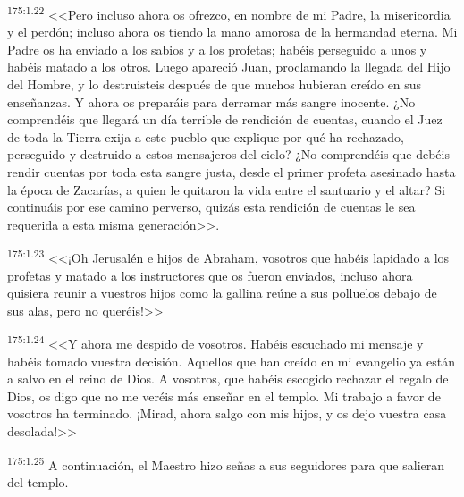 \par 
\textsuperscript{175:1.22} <<Pero incluso ahora os ofrezco, en nombre de mi Padre, la misericordia y el perdón; incluso ahora os tiendo la mano amorosa de la hermandad eterna. Mi Padre os ha enviado a los sabios y a los profetas; habéis perseguido a unos y habéis matado a los otros. Luego apareció Juan, proclamando la llegada del Hijo del Hombre, y lo destruisteis después de que muchos hubieran creído en sus enseñanzas. Y ahora os preparáis para derramar más sangre inocente. ¿No comprendéis que llegará un día terrible de rendición de cuentas, cuando el Juez de toda la Tierra exija a este pueblo que explique por qué ha rechazado, perseguido y destruido a estos mensajeros del cielo? ¿No comprendéis que debéis rendir cuentas por toda esta sangre justa, desde el primer profeta asesinado hasta la época de Zacarías, a quien le quitaron la vida entre el santuario y el altar? Si continuáis por ese camino perverso, quizás esta rendición de cuentas le sea requerida a esta misma generación>>.

\par 
\textsuperscript{175:1.23} <<¡Oh Jerusalén e hijos de Abraham, vosotros que habéis lapidado a los profetas y matado a los instructores que os fueron enviados, incluso ahora quisiera reunir a vuestros hijos como la gallina reúne a sus polluelos debajo de sus alas, pero no queréis!>>

\par 
\textsuperscript{175:1.24} <<Y ahora me despido de vosotros. Habéis escuchado mi mensaje y habéis tomado vuestra decisión. Aquellos que han creído en mi evangelio ya están a salvo en el reino de Dios. A vosotros, que habéis escogido rechazar el regalo de Dios, os digo que no me veréis más enseñar en el templo. Mi trabajo a favor de vosotros ha terminado. ¡Mirad, ahora salgo con mis hijos, y os dejo vuestra casa desolada!>>

\par 
\textsuperscript{175:1.25} A continuación, el Maestro hizo señas a sus seguidores para que salieran del templo.

